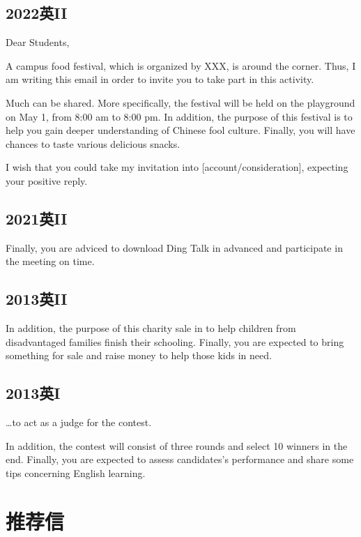 \section{2022英II}

\noindent Dear Students,

A campus food festival, which is organized by XXX, is around the corner.
Thus, I am writing this email in order to invite you to take part in this activity.

Much can be shared. More specifically, the festival will be held on the playground on May 1,
from 8:00 am to 8:00 pm. In addition, the purpose of this festival is to help you gain deeper 
understanding of Chinese fool culture.
Finally, you will have chances to taste various delicious snacks. 

I wish that you could take my invitation into [account/consideration], expecting your positive reply.

\YSLM

\section{2021英II}

Finally, you are adviced to download Ding Talk in advanced and participate in the meeting on time.

\section{2013英II}

In addition, the purpose of this charity sale in to help children from disadvantaged families
finish their schooling.
Finally, you are expected to bring something for sale and raise money to help those kids in need.

\newpage

\section{2013英I}

\dots to act as a judge for the contest.

In addition, the contest will consist of three rounds and select 10 winners in the end.
Finally, you are expected to assess candidates's performance 
and share some tips concerning English learning.

\chapter{推荐信}

